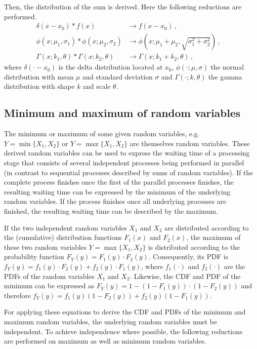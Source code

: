 Then, the distribution of the sum is derived. Here the following reductions are performed.
\begin{align}
 \delta(x-x_0)\ast f(x) &\longrightarrow f(x-x_0)\,, \nonumber \\
 \phi(x; \mu_1, \sigma_1)\ast \phi(x; \mu_2, \sigma_2) &\longrightarrow 
   \phi(x; \mu_1+\mu_2, \sqrt{\sigma_1^2+\sigma_2^2}) \nonumber\,, \\
 \Gamma(x; k_1, \theta)\ast \Gamma(x; k_2, \theta) &\longrightarrow 
   \Gamma(x; k_1+k_2, \theta)\,, \nonumber
\end{align}
where $\delta(\cdot-x_0)$ is the delta distribution located at $x_0$, $\phi(\cdot; \mu, \sigma)$ 
the normal distribution with mean $\mu$ and standard deviation $\sigma$ and 
$\Gamma(\cdot; k, \theta)$ the gamma distribution with shape $k$ and scale $\theta$.

\subsection{Minimum and maximum of random variables}
The minimum or maximum of some given random variables, e.g. $Y=\min\{X_1,X_2\}$ or 
$Y=\max\{X_1,X_2\}$ are themselves random variables. These derived random variables can be used to
express the waiting time of a processing stage that consists of several independent processes being
performed in parallel (in contrast to sequential processes described by sums of random variables). 
If the complete process finishes once the first of the parallel processes finishes, the 
resulting waiting time can be expressed by the minimum of the underlying random variables. If the process
finishes once all underlying processes are finished, the resulting waiting time can be described
by the maximum.	 

If the two independent random variables $X_1$ and $X_2$ are distributed according to the (cumulative) distribution
functions $F_1(x)$ and $F_2(x)$, the maximum of these two random variables $Y=\max\{X_1,X_2\}$
is distributed according to the probability function $F_Y(y)=F_1(y)\cdot F_2(y)$. Consequently, its PDF
is $f_Y(y)=f_1(y)\cdot F_2(y) + f_2(y)\cdot F_1(y)$, where $f_1(\cdot)$ and $f_2(\cdot)$ are the PDFs
of the random variables $X_1$ and $X_2$. Likewise, the CDF and PDF of the minimum can be expressed as
$F_Y(y)=1-(1-F_1(y))\cdot(1-F_2(y))$ and therefore $f_Y(y) = f_1(y)(1-F_2(y)) + f_2(y)(1-F_1(y))$.

For applying these equations to derive the CDF and PDFs of the minimum and maximum random variables, the 
underlying random variables must be independent. To achieve independence where possible, the following 
reductions are performed on maximum as well as minimum random variables.

